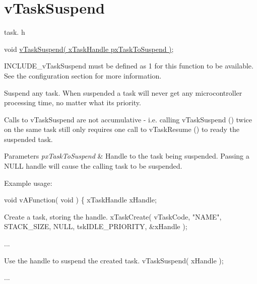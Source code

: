 \hypertarget{group__v_task_suspend}{\section{v\-Task\-Suspend}
\label{group__v_task_suspend}
}
task. h 
\begin{DoxyPre}void \hyperlink{tasks_8c_a5ff4e8e6b960afcc505c6427002526f6}{vTaskSuspend( xTaskHandle pxTaskToSuspend )};\end{DoxyPre}


I\-N\-C\-L\-U\-D\-E\-\_\-v\-Task\-Suspend must be defined as 1 for this function to be available. See the configuration section for more information.

Suspend any task. When suspended a task will never get any microcontroller processing time, no matter what its priority.

Calls to v\-Task\-Suspend are not accumulative -\/ i.\-e. calling v\-Task\-Suspend () twice on the same task still only requires one call to v\-Task\-Resume () to ready the suspended task.


\begin{DoxyParams}{Parameters}
{\em px\-Task\-To\-Suspend} & Handle to the task being suspended. Passing a N\-U\-L\-L handle will cause the calling task to be suspended.\\
\hline
\end{DoxyParams}
Example usage\-: 
\begin{DoxyPre}
 void vAFunction( void )
 \{
 xTaskHandle xHandle;\end{DoxyPre}



\begin{DoxyPre}Create a task, storing the handle.
     xTaskCreate( vTaskCode, "NAME", STACK\_SIZE, NULL, tskIDLE\_PRIORITY, \&xHandle );\end{DoxyPre}



\begin{DoxyPre}...\end{DoxyPre}



\begin{DoxyPre}Use the handle to suspend the created task.
     vTaskSuspend( xHandle );\end{DoxyPre}



\begin{DoxyPre}...\end{DoxyPre}



